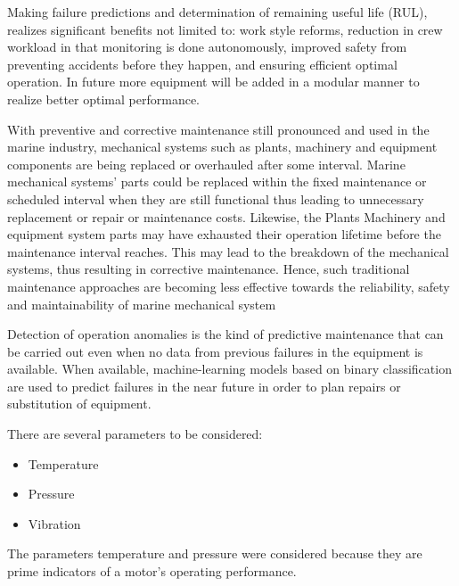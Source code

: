  Making failure predictions and determination of remaining useful life (RUL), realizes significant benefits not limited to: work style reforms, reduction in crew workload in that monitoring is done autonomously, improved safety from preventing accidents before they happen, and ensuring efficient optimal operation. In future more equipment will be added in a modular manner to realize better optimal performance.  

With preventive and corrective maintenance still pronounced and used in the marine industry, mechanical systems such as plants, machinery and equipment components are being replaced or overhauled after some interval. Marine mechanical systems’ parts could be replaced within the fixed maintenance or scheduled interval when they are still functional thus leading to unnecessary replacement or repair or maintenance costs. Likewise, the Plants Machinery and equipment system parts may have exhausted their operation lifetime before the maintenance interval reaches. This may lead to the breakdown of the mechanical systems, thus resulting in corrective maintenance. Hence, such traditional maintenance approaches are becoming less effective towards the reliability, safety and maintainability of marine mechanical system 

Detection of operation anomalies is the kind of predictive maintenance that can be carried out even when no data from previous failures in the equipment is available. When available, machine-learning models based on binary classification are used to predict failures in the near future in order to plan repairs or substitution of equipment\cite{han_motor_2019}.

There are several parameters to be considered:
\begin{itemize}
	\item Temperature 
	\item Pressure
	\item Vibration
\end{itemize} 






The parameters temperature and pressure were considered because they are prime indicators of a motor’s operating performance. 

